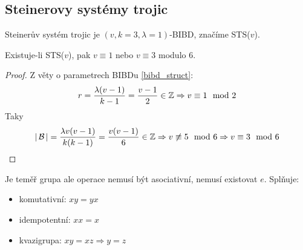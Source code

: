 \subsection{Steinerovy systémy trojic}

\begin{definition}
    Steinerův systém trojic je $(v,k=3,\lambda=1)$-BIBD, značíme STS($v$).
\end{definition}

\begin{theorem}
    Existuje-li STS($v$), pak $v\equiv 1$ nebo $v\equiv 3$ modulo 6.
\end{theorem}
\begin{proof}
	Z věty o parametrech BIBDu \cref{bibd_struct}:
	\[ r = \frac{\lambda (v - 1)}{k - 1} = \frac{v - 1}{2} \in \operatorname{\mathbb{Z}} \Rightarrow v \equiv 1 \mod 2 \]
	Taky
	\[ |\operatorname{\mathcal{B}}| = \frac{\lambda v (v - 1)}{k(k - 1)} = \frac{v (v - 1)}{6} \in \operatorname{\mathbb{Z}} \Rightarrow v \not\equiv 5 \mod 6 \Rightarrow v \equiv 3 \mod 6 \]
\end{proof}

\begin{definition}\label{kvgr}
	Je teměř grupa ale operace nemusí být asociativní, nemusí existovat $e$.
	Splňuje:
    \begin{itemize}
        \item komutativní: $xy=yx$
        \item idempotentní: $xx=x$
        \item kvazigrupa: $xy=xz\Rightarrow y=z$
    \end{itemize}
\end{definition}

